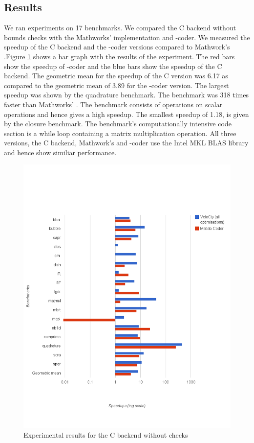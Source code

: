 \subsection{\matlab Results}
We ran experiments on 17 \matlab benchmarks. We compared the C backend without bounds checks with the Mathworks' \matlab implementation and \matlab-coder. We measured the speedup of the C backend and the \matlab-coder versions compared to  Mathwork's \matlab.Figure \ref{fig:results_cwochecks} shows a bar graph with the results of the experiment. The red bars show the speedup of \matlab-coder and the blue bars show the speedup of the C backend. The geometric mean for the speedup of the C version was 6.17 as compared to the geometric mean of 3.89 for the \matlab-coder version. The largest speedup was shown by the quadrature benchmark. The benchmark was 318 times faster than Mathworks' \matlab. The benchmark consists of operations on scalar operations and hence gives a high speedup. The smallest speedup of 1.18, is given by the closure benchmark. The benchmark's computationally intensive code section is a while loop containing a matrix multiplication operation. All three versions, the C backend, Mathwork's \matlab and \matlab-coder use the Intel MKL BLAS library and hence show similiar performance. 
\begin{figure}[htbp]
\centering
\includegraphics[scale=0.6]{Figures/results_cwochecks.png}
\caption{Experimental results for the C backend without checks}
\label{fig:results_cwochecks}
\end{figure}

